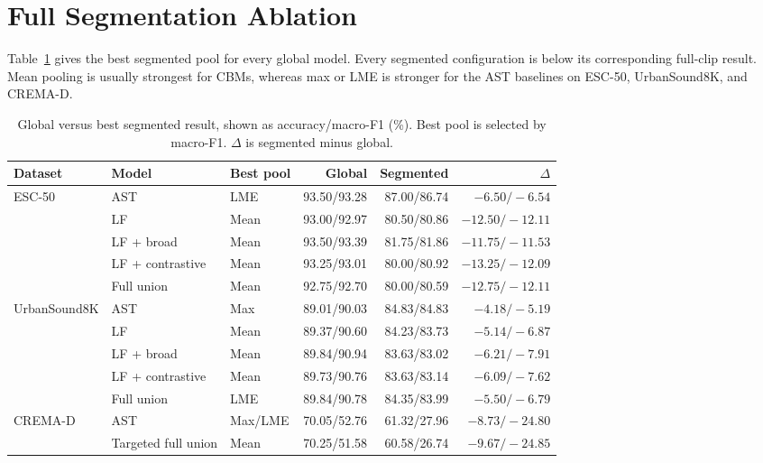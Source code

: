 \documentclass[10pt]{article}
\begin{document}
\balance



\clearpage
\appendix

\section{Full Segmentation Ablation}
\label{app:segmentation}
Table~\ref{tab:segall} gives the best segmented pool for every global model. Every segmented configuration is below its corresponding full-clip result. Mean pooling is usually strongest for CBMs, whereas max or LME is stronger for the AST baselines on ESC-50, UrbanSound8K, and CREMA-D.

\begin{table}[h]
\centering
\small
\caption{Global versus best segmented result, shown as accuracy/macro-F1 (\%). Best pool is selected by macro-F1. $\Delta$ is segmented minus global.}
\label{tab:segall}
\setlength{\tabcolsep}{4.3pt}
\begin{tabular}{lllrrr}
\toprule
Dataset & Model & Best pool & Global & Segmented & $\Delta$ \\
\midrule
\multirow{5}{*}{ESC-50}
& AST & LME & 93.50/93.28 & 87.00/86.74 & $-6.50/-6.54$ \\
& LF & Mean & 93.00/92.97 & 80.50/80.86 & $-12.50/-12.11$ \\
& LF + broad & Mean & 93.50/93.39 & 81.75/81.86 & $-11.75/-11.53$ \\
& LF + contrastive & Mean & 93.25/93.01 & 80.00/80.92 & $-13.25/-12.09$ \\
& Full union & Mean & 92.75/92.70 & 80.00/80.59 & $-12.75/-12.11$ \\
\midrule
\multirow{5}{*}{UrbanSound8K}
& AST & Max & 89.01/90.03 & 84.83/84.83 & $-4.18/-5.19$ \\
& LF & Mean & 89.37/90.60 & 84.23/83.73 & $-5.14/-6.87$ \\
& LF + broad & Mean & 89.84/90.94 & 83.63/83.02 & $-6.21/-7.91$ \\
& LF + contrastive & Mean & 89.73/90.76 & 83.63/83.14 & $-6.09/-7.62$ \\
& Full union & LME & 89.84/90.78 & 84.35/83.99 & $-5.50/-6.79$ \\
\midrule
\multirow{2}{*}{CREMA-D}
& AST & Max/LME & 70.05/52.76 & 61.32/27.96 & $-8.73/-24.80$ \\
& Targeted full union & Mean & 70.25/51.58 & 60.58/26.74 & $-9.67/-24.85$ \\
\bottomrule
\end{tabular}
\end{table}
\end{document}
